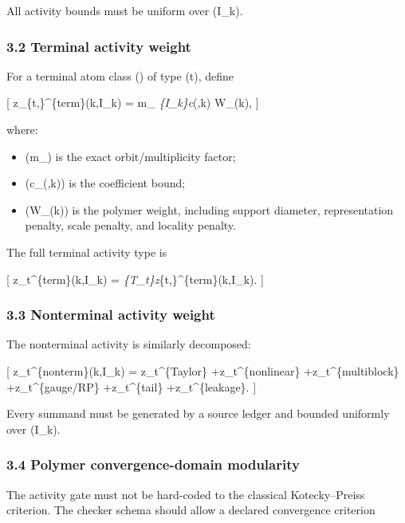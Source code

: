 \documentclass[
]{article}
\providecommand{\tightlist}{%
  \setlength{\itemsep}{0pt}\setlength{\parskip}{0pt}}
\begin{document}
All activity bounds must be uniform over (\beta\in I\_k).

\subsubsection{3.2 Terminal activity
weight}\label{terminal-activity-weight}

For a terminal atom class (\alpha) of type (t), define

{[} z\_\{t,\alpha\}\^{}\{\rm term\}(k,I\_k) = m\_\alpha
\sup\emph{\{\beta\in I\_k\}\textbar c}\alpha(\beta,k)\textbar{}
W\_\alpha(k), {]}

where:

\begin{itemize}
\tightlist
\item
  (m\_\alpha) is the exact orbit/multiplicity factor;
\item
  (c\_\alpha(\beta,k)) is the coefficient bound;
\item
  (W\_\alpha(k)) is the polymer weight, including support diameter,
  representation penalty, scale penalty, and locality penalty.
\end{itemize}

The full terminal activity type is

{[} z\_t\^{}\{\rm term\}(k,I\_k) =
\sum\emph{\{\alpha\in T\_t\}z}\{t,\alpha\}\^{}\{\rm term\}(k,I\_k). {]}

\subsubsection{3.3 Nonterminal activity
weight}\label{nonterminal-activity-weight}

The nonterminal activity is similarly decomposed:

{[} z\_t\^{}\{\rm nonterm\}(k,I\_k) = z\_t\^{}\{\rm Taylor\}
+z\_t\^{}\{\rm nonlinear\} +z\_t\^{}\{\rm multiblock\}
+z\_t\^{}\{\rm gauge/RP\} +z\_t\^{}\{\rm tail\}
+z\_t\^{}\{\rm leakage\}. {]}

Every summand must be generated by a source ledger and bounded uniformly
over (I\_k).

\subsubsection{3.4 Polymer convergence-domain
modularity}\label{polymer-convergence-domain-modularity}

The activity gate must not be hard-coded to the classical
Kotecky--Preiss criterion. The checker schema should allow a declared
convergence criterion
\end{document}
